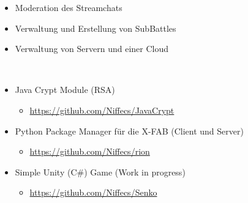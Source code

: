 \documentclass[10pt,a4paper,ragged2e,withhyper]{altacv}
\begin{document}
\begin{paracol}{2}
\divider



\begin{itemize}
\item Moderation des Streamchats
\item Verwaltung und Erstellung von SubBattles
\item Verwaltung von Servern und einer Cloud
\end{itemize}


\switchcolumn




\cvtag{\LaTeX}


\divider\smallskip

\\








\divider




\printbibliography[heading=pubtype,title={\printinfo{\faFile*[regular]}{Softwareprojekte}}, type=article]


\begin{itemize}
    \item Java Crypt Module (RSA)
    \begin{itemize}
        \item \url{https://github.com/Niffecs/JavaCrypt}
    \end{itemize}
    \item Python Package Manager für die X-FAB (Client und Server)
    \begin{itemize}
        \item \url{https://github.com/Niffecs/rion}
    \end{itemize}
    \item Simple Unity (C\#) Game (Work in progress)
    \begin{itemize}
        \item \url{https://github.com/Niffecs/Senko}
    \end{itemize}
    

\end{itemize}
\end{paracol}
\end{document}
